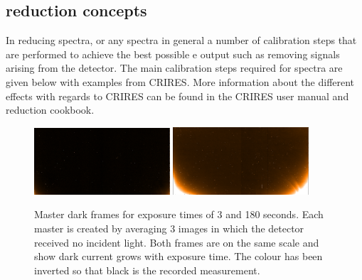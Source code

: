 \subsection{\nir{} reduction concepts}
\label{subsec:nirreduction}
In reducing \nir{} spectra, or any spectra in general a number of calibration steps that are performed to achieve the best possible e output such as removing signals arising from the detector.
The main calibration steps required for \nir{} spectra are given below with examples from {CRIRES}.
More information about the different effects with regards to CRIRES can be found in the CRIRES user manual and reduction cookbook.
\begin{figure}[h]
    \centering
    \includegraphics[width=0.45\textwidth]{figures/reduction/MasterDarkFlat_1.png}
    \includegraphics[width=0.45\textwidth]{figures/reduction/MasterDarkSpec_1.png}
    \caption[Example dark frames for different exposure times.]{Master dark frames for exposure times of 3 and 180 seconds.
Each master is created by averaging 3 images in which the detector received no incident light.
Both frames are on the same scale and show dark current grows with exposure time.
The colour has been inverted so that black is the recorded measurement.}
    \label{fig:darkcurrent_colour}
\end{figure}

